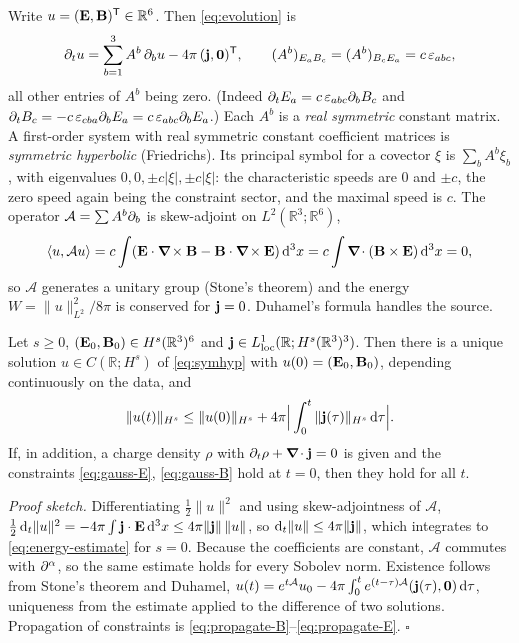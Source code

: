 Write $u=(\mathbf{E},\mathbf{B})^{\mathsf T}\in\mathbb R^6$.  Then \eqref{eq:evolution} is
\begin{equation}\label{eq:symhyp}
\partial_t u=\sum_{b=1}^{3}A^b\,\partial_b u-4\pi\,(\mathbf{j},\mathbf 0)^{\mathsf T},\qquad
(A^b)_{E_aB_c}=(A^b)_{B_cE_a}=c\,\varepsilon_{abc},
\end{equation}
all other entries of $A^b$ being zero.  (Indeed
$\partial_tE_a=c\,\varepsilon_{abc}\partial_bB_c$ and
$\partial_tB_c=-c\,\varepsilon_{cba}\partial_bE_a=c\,\varepsilon_{abc}\partial_bE_a$.)
Each $A^b$ is a \emph{real symmetric} constant matrix.  A first-order system with
real symmetric constant coefficient matrices is \emph{symmetric
hyperbolic} (Friedrichs).  Its principal symbol for a covector
$\xi$ is $\sum_bA^b\xi_b$, with eigenvalues $0,0,\pm c|\xi|,\pm c|\xi|$:
the characteristic speeds are $0$ and $\pm c$, the zero speed again being the
constraint sector, and the maximal speed is $c$.  The operator
$\mathcal A=\sum A^b\partial_b$ is skew-adjoint on
$L^2(\mathbb R^3;\mathbb R^6)$,
\begin{equation}
\langle u,\mathcal Au\rangle=c\int(\mathbf{E}\cdot\boldsymbol{\nabla}\!\times\mathbf{B}-\mathbf{B}\cdot\boldsymbol{\nabla}\!\times\mathbf{E})\,\mathrm{d}^3x
=c\int\boldsymbol{\nabla}\!\cdot(\mathbf{B}\times\mathbf{E})\,\mathrm{d}^3x=0,
\end{equation}
so $\mathcal A$ generates a unitary group (Stone's theorem) and the energy
$W=\|u\|^2_{L^2}/8\pi$ is conserved for $\mathbf{j}=0$.  Duhamel's formula
handles the source.

\begin{theorem}\label{thm:wellposed}
Let $s\ge0$, $(\mathbf{E}_0,\mathbf{B}_0)\in H^s(\mathbb R^3)^6$ and
$\mathbf{j}\in L^1_{\rm loc}(\mathbb R;H^s(\mathbb R^3)^3)$.  Then there is a unique
solution $u\in C(\mathbb R;H^s)$ of \eqref{eq:symhyp} with
$u(0)=(\mathbf{E}_0,\mathbf{B}_0)$, depending continuously on the data, and
\begin{equation}\label{eq:energy-estimate}
\|u(t)\|_{H^s}\le\|u(0)\|_{H^s}+4\pi\Big|\int_0^t\|\mathbf{j}(\tau)\|_{H^s}\,\mathrm{d}\tau\Big| .
\end{equation}
If, in addition, a charge density $\rho$ with $\partial_t\rho+\boldsymbol{\nabla}\!\cdot\mathbf{j}=0$ is
given and the constraints \eqref{eq:gauss-E}, \eqref{eq:gauss-B} hold at
$t=0$, then they hold for all $t$.
\end{theorem}
\noindent\emph{Proof sketch.}  Differentiating $\tfrac12\|u\|^2$ and using
skew-adjointness of $\mathcal A$,
$\tfrac12\,\mathrm{d}_t\|u\|^2=-4\pi\int\mathbf{j}\cdot\mathbf{E}\,\mathrm{d}^3x\le4\pi\|\mathbf{j}\|\,\|u\|$,
so $\mathrm{d}_t\|u\|\le4\pi\|\mathbf{j}\|$, which integrates to
\eqref{eq:energy-estimate} for $s=0$.  Because the coefficients are
constant, $\mathcal A$ commutes with $\partial^\alpha$, so the same estimate
holds for every Sobolev norm.  Existence follows from Stone's theorem
and Duhamel, $u(t)=e^{t\mathcal A}u_0-4\pi\int_0^te^{(t-\tau)\mathcal A}(\mathbf{j}(\tau),\mathbf0)\,\mathrm{d}\tau$,
uniqueness from the estimate applied to the difference of two
solutions.  Propagation of constraints is \eqref{eq:propagate-B}--\eqref{eq:propagate-E}.
$\square$

